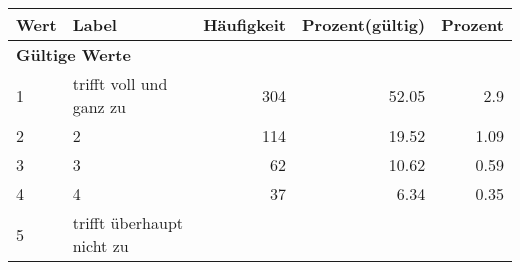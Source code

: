      \begin{longtable}{lXrrr}
     \toprule
     \textbf{Wert} & \textbf{Label} & \textbf{Häufigkeit} & \textbf{Prozent(gültig)} & \textbf{Prozent} \\
     \endhead
     \midrule
     \multicolumn{5}{l}{\textbf{Gültige Werte}}\\

     1 &
     \multicolumn{1}{X}{ trifft voll und ganz zu   } &


       \num{304} &
       \num[round-mode=places,round-precision=2]{52,05} &
         \num[round-mode=places,round-precision=2]{2,9} \\

     2 &
     \multicolumn{1}{X}{ 2   } &


       \num{114} &
       \num[round-mode=places,round-precision=2]{19,52} &
         \num[round-mode=places,round-precision=2]{1,09} \\

     3 &
     \multicolumn{1}{X}{ 3   } &


       \num{62} &
       \num[round-mode=places,round-precision=2]{10,62} &
         \num[round-mode=places,round-precision=2]{0,59} \\

     4 &
     \multicolumn{1}{X}{ 4   } &


       \num{37} &
       \num[round-mode=places,round-precision=2]{6,34} &
         \num[round-mode=places,round-precision=2]{0,35} \\

     5 &
     \multicolumn{1}{X}{ trifft überhaupt nicht zu   } &



\end{longtable}
